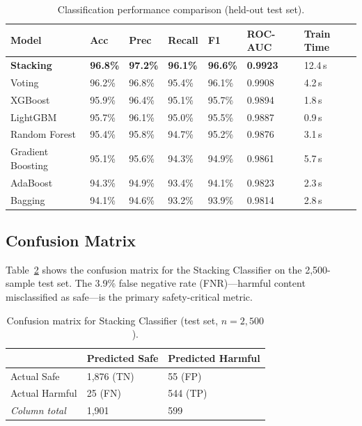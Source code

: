 \documentclass[10pt,letterpaper]{article}
\begin{document}
\begin{table}[ht]
\centering
\caption{Classification performance comparison (held-out test set).}
\label{tab:models}
\begin{tabular}{lllllll}
\toprule
Model & Acc & Prec & Recall & F1 & ROC-AUC & Train Time \\
\midrule
\textbf{Stacking} & \textbf{96.8\%} & \textbf{97.2\%} & \textbf{96.1\%}
  & \textbf{96.6\%} & \textbf{0.9923} & 12.4\,s \\
Voting & 96.2\% & 96.8\% & 95.4\% & 96.1\% & 0.9908 & 4.2\,s \\
XGBoost & 95.9\% & 96.4\% & 95.1\% & 95.7\% & 0.9894 & 1.8\,s \\
LightGBM & 95.7\% & 96.1\% & 95.0\% & 95.5\% & 0.9887 & 0.9\,s \\
Random Forest & 95.4\% & 95.8\% & 94.7\% & 95.2\% & 0.9876 & 3.1\,s \\
Gradient Boosting & 95.1\% & 95.6\% & 94.3\% & 94.9\% & 0.9861 & 5.7\,s \\
AdaBoost & 94.3\% & 94.9\% & 93.4\% & 94.1\% & 0.9823 & 2.3\,s \\
Bagging & 94.1\% & 94.6\% & 93.2\% & 93.9\% & 0.9814 & 2.8\,s \\
\bottomrule
\end{tabular}
\end{table}

\subsection{Confusion Matrix}

Table~\ref{tab:confmat} shows the confusion matrix for the Stacking Classifier
on the 2,500-sample test set.  The 3.9\% false negative rate (FNR)---harmful
content misclassified as safe---is the primary safety-critical metric.

\begin{table}[ht]
\centering
\caption{Confusion matrix for Stacking Classifier (test set, $n=2{,}500$).}
\label{tab:confmat}
\begin{tabular}{lll}
\toprule
 & Predicted Safe & Predicted Harmful \\
\midrule
Actual Safe & 1,876 (TN) & 55 (FP) \\
Actual Harmful & 25 (FN) & 544 (TP) \\
\midrule
\textit{Column total} & 1,901 & 599 \\
\bottomrule
\end{tabular}
\end{table}
\end{document}
